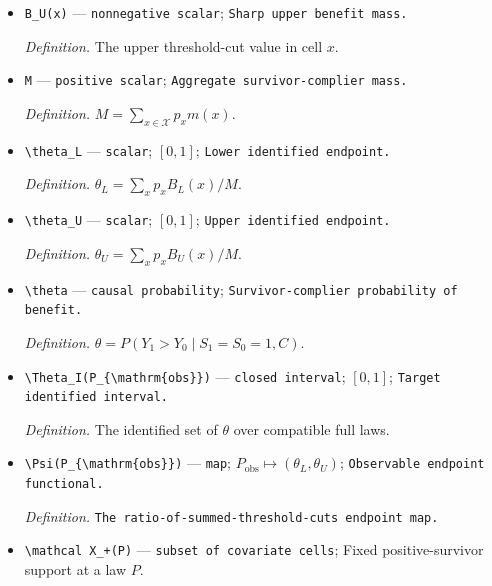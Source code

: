 \documentclass{article}
\begin{document}
\begin{itemize}
  \par\smallskip\noindent\emph{Definition.} The lower threshold-cut value in cell \(x\).
  \item \texttt{B\_\allowbreak{}U(x)} --- \texttt{nonnegative scalar}; \texttt{Sharp upper benefit mass.}
  \par\smallskip\noindent\emph{Definition.} The upper threshold-cut value in cell \(x\).
  \item \texttt{M} --- \texttt{positive scalar}; \texttt{Aggregate survivor-\allowbreak{}complier mass.}
  \par\smallskip\noindent\emph{Definition.} \(M=\sum_{x\in\mathcal X}p_xm(x)\).
  \item \texttt{\textbackslash{}\allowbreak{}theta\_\allowbreak{}L} --- \texttt{scalar}; \([0,1]\); \texttt{Lower identified endpoint.}
  \par\smallskip\noindent\emph{Definition.} \(\theta_L=\sum_xp_xB_L(x)/M\).
  \item \texttt{\textbackslash{}\allowbreak{}theta\_\allowbreak{}U} --- \texttt{scalar}; \([0,1]\); \texttt{Upper identified endpoint.}
  \par\smallskip\noindent\emph{Definition.} \(\theta_U=\sum_xp_xB_U(x)/M\).
  \item \texttt{\textbackslash{}\allowbreak{}theta} --- \texttt{causal probability}; \texttt{Survivor-\allowbreak{}complier probability of benefit.}
  \par\smallskip\noindent\emph{Definition.} \(\theta=P(Y_1>Y_0\mid S_1=S_0=1,C)\).
  \item \texttt{\textbackslash{}\allowbreak{}Theta\_\allowbreak{}I(P\_\allowbreak{}\{\textbackslash{}\allowbreak{}mathrm\{obs\}\allowbreak{}\}\allowbreak{})} --- \texttt{closed interval}; \([0,1]\); \texttt{Target identified interval.}
  \par\smallskip\noindent\emph{Definition.} The identified set of \(\theta\) over compatible full laws.
  \item \texttt{\textbackslash{}\allowbreak{}Psi(P\_\allowbreak{}\{\textbackslash{}\allowbreak{}mathrm\{obs\}\allowbreak{}\}\allowbreak{})} --- \texttt{map}; \(P_{\mathrm{obs}}\mapsto(\theta_L,\theta_U)\); \texttt{Observable endpoint functional.}
  \par\smallskip\noindent\emph{Definition.} \texttt{The ratio-\allowbreak{}of-\allowbreak{}summed-\allowbreak{}threshold-\allowbreak{}cuts endpoint map.}
  \item \texttt{\textbackslash{}\allowbreak{}mathcal X\_\allowbreak{}+\allowbreak{}(P)} --- \texttt{subset of covariate cells}; Fixed positive-survivor support at a law \(P\).

\end{itemize}
\end{document}
